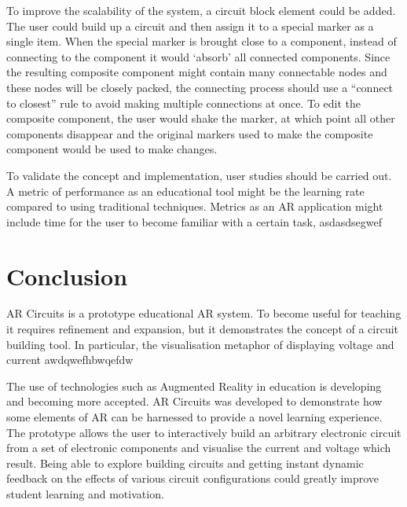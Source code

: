 To improve the scalability of the system, a circuit block element could be added. The user could build up a circuit and then assign it to a special marker as a single item. When the special marker is brought close to a component, instead of connecting to the component it would `absorb' all connected components. Since the resulting composite component might contain many connectable nodes and these nodes will be closely packed, the connecting process should use a ``connect to closest'' rule to avoid making multiple connections at once. To edit the composite component, the user would shake the marker, at which point all other components disappear and the original markers used to make the composite component would be used to make changes.

To validate the concept and implementation, user studies should be carried out. A metric of performance as an educational tool might be the learning rate compared to using traditional techniques. Metrics as an AR application might include time for the user to become familiar with a certain task, asdasdsegwef

\section{Conclusion}

AR Circuits is a prototype educational AR system. To become useful for teaching it requires refinement and expansion, but it demonstrates the concept of a circuit building tool. In particular, the visualisation metaphor of displaying voltage and current awdqwefhbwqefdw

The use of technologies such as Augmented Reality in education is developing and becoming more accepted. AR Circuits was developed to demonstrate how some elements of AR can be harnessed to provide a novel learning experience. The prototype allows the user to interactively build an arbitrary electronic circuit from a set of electronic components and visualise the current and voltage which result. Being able to explore building circuits and getting instant dynamic feedback on the effects of various circuit configurations could greatly improve student learning and motivation.







